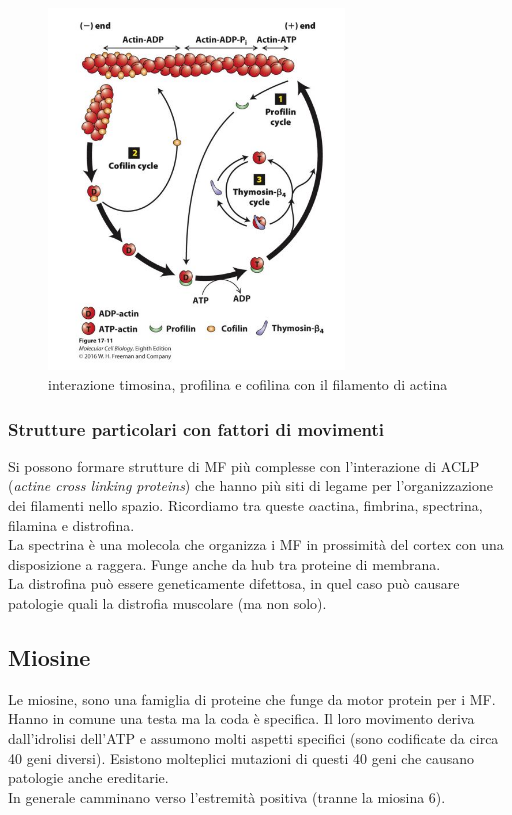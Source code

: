                 \begin{figure}[h]
                    \centering
                    \includegraphics[width=0.7\textwidth]{images/agentiActina.JPG}
                    \caption{\small interazione timosina, profilina e cofilina con il filamento di actina}
                    \label{fig:mesh1}
                \end{figure}
            
        \subsubsection{Strutture particolari con fattori di movimenti}
            Si possono formare strutture di MF più complesse con l'interazione di ACLP (\textit{actine cross linking proteins}) che hanno più siti di legame per l'organizzazione dei filamenti nello spazio. Ricordiamo tra queste $\alpha$actina, fimbrina, spectrina, filamina e distrofina.   \\
            La spectrina è una molecola che organizza i MF in prossimità del cortex con una disposizione a raggera. Funge anche da hub tra proteine di membrana.\\
            La distrofina può essere geneticamente difettosa, in quel caso può causare patologie quali la distrofia muscolare (ma non solo).
            
    \subsection{Miosine}
        Le miosine, sono una famiglia di proteine che funge da motor protein per i MF. Hanno in comune una testa ma la coda è specifica. Il loro movimento deriva dall'idrolisi dell'ATP e assumono molti aspetti specifici (sono codificate da circa 40 geni diversi). Esistono molteplici mutazioni di questi 40 geni che causano patologie anche ereditarie.\\
        In generale camminano verso l'estremità positiva (tranne la miosina 6).
        
